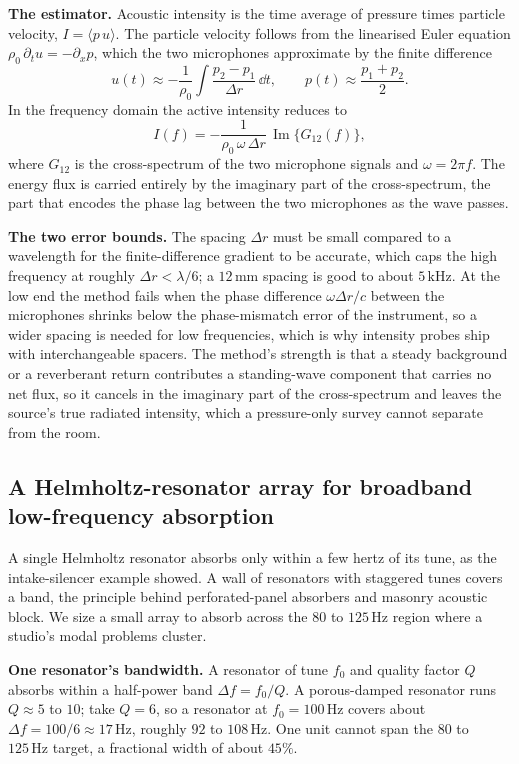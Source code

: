 \textbf{The estimator.} Acoustic intensity is the time average of pressure
times particle velocity, $I=\langle p\,u\rangle$. The particle velocity
follows from the linearised Euler equation
$\rho_0\,\partial_t u = -\partial_x p$, which the two microphones
approximate by the finite difference
\[
u(t) \approx -\frac{1}{\rho_0}\int \frac{p_2-p_1}{\Delta r}\,\dd t,
\qquad p(t)\approx \frac{p_1+p_2}{2}.
\]
In the frequency domain the active intensity reduces to
\[
I(f) = -\frac{1}{\rho_0\,\omega\,\Delta r}\,\operatorname{Im}\{G_{12}(f)\},
\]
where $G_{12}$ is the cross-spectrum of the two microphone signals and
$\omega=2\pi f$. The energy flux is carried entirely by the imaginary part
of the cross-spectrum, the part that encodes the phase lag between the two
microphones as the wave passes.

\textbf{The two error bounds.} The spacing $\Delta r$ must be small compared
to a wavelength for the finite-difference gradient to be accurate, which
caps the high frequency at roughly $\Delta r < \lambda/6$; a
$12\,\si{\milli\meter}$ spacing is good to about $5\,\si{\kilo\hertz}$. At
the low end the method fails when the phase difference $\omega\Delta r/c$
between the microphones shrinks below the phase-mismatch error of the
instrument, so a wider spacing is needed for low frequencies, which is why
intensity probes ship with interchangeable spacers. The method's strength
is that a steady background or a reverberant return contributes a
standing-wave component that carries no net flux, so it cancels in the
imaginary part of the cross-spectrum and leaves the source's true radiated
intensity, which a pressure-only survey cannot separate from the room.

\subsection{A Helmholtz-resonator array for broadband low-frequency
absorption}

A single Helmholtz resonator absorbs only within a few hertz of its tune,
as the intake-silencer example showed. A wall of resonators with staggered
tunes covers a band, the principle behind perforated-panel absorbers and
masonry acoustic block. We size a small array to absorb across the
$80$ to $125\,\si{\hertz}$ region where a studio's modal problems cluster.

\textbf{One resonator's bandwidth.} A resonator of tune $f_0$ and quality
factor $Q$ absorbs within a half-power band $\Delta f = f_0/Q$. A
porous-damped resonator runs $Q\approx 5$ to $10$; take $Q=6$, so a
resonator at $f_0=100\,\si{\hertz}$ covers about
$\Delta f = 100/6 \approx 17\,\si{\hertz}$, roughly $92$ to
$108\,\si{\hertz}$. One unit cannot span the $80$ to $125\,\si{\hertz}$
target, a fractional width of about $45\%$.

